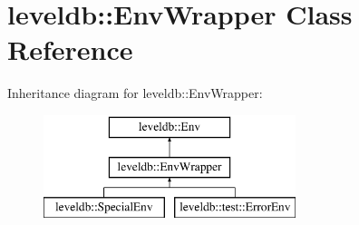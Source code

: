 \hypertarget{classleveldb_1_1_env_wrapper}{}\section{leveldb\+:\+:Env\+Wrapper Class Reference}
\label{classleveldb_1_1_env_wrapper}
Inheritance diagram for leveldb\+:\+:Env\+Wrapper\+:\begin{figure}[H]
\begin{center}
\leavevmode
\includegraphics[height=3.000000cm]{classleveldb_1_1_env_wrapper}
\end{center}
\end{figure}
